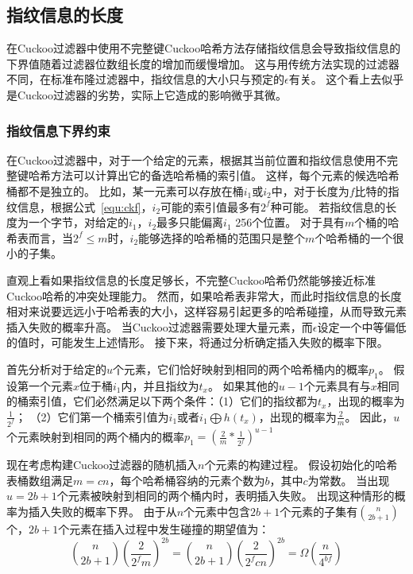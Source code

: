 \subsection{指纹信息的长度}
在Cuckoo过滤器中使用不完整键Cuckoo哈希方法存储指纹信息会导致指纹信息的下界值随着过滤器位数组长度的增加而缓慢增加。
这与用传统方法实现的过滤器不同，在标准布隆过滤器中，指纹信息的大小只与预定的$\epsilon$有关。
这个看上去似乎是Cuckoo过滤器的劣势，实际上它造成的影响微乎其微。

\subsubsection{指纹信息下界约束}
在Cuckoo过滤器中，对于一个给定的元素，根据其当前位置和指纹信息使用不完整键哈希方法可以计算出它的备选哈希桶的索引值。
这样，每个元素的候选哈希桶都不是独立的。
比如，某一元素可以存放在桶$i_1$或$i_2$中，对于长度为$f$比特的指纹信息，根据公式~\ref{equ:ckf}，$i_2$可能的索引值最多有$2^f$种可能。
若指纹信息的长度为一个字节，对给定的$i_1$，$i_2$最多只能偏离$i_1$ 256个位置。
对于具有$m$个桶的哈希表而言，当$2^f \leq m$时，$i_2$能够选择的哈希桶的范围只是整个$m$个哈希桶的一个很小的子集。

直观上看如果指纹信息的长度足够长，不完整Cuckoo哈希仍然能够接近标准Cuckoo哈希的冲突处理能力。
然而，如果哈希表非常大，而此时指纹信息的长度相对来说要远远小于哈希表的大小，这样容易引起更多的哈希碰撞，从而导致元素插入失败的概率升高。
当Cuckoo过滤器需要处理大量元素，而$\epsilon$设定一个中等偏低的值时，可能发生上述情形。
接下来，将通过分析确定插入失败的概率下限。

首先分析对于给定的$u$个元素，它们恰好映射到相同的两个哈希桶内的概率$p_1$。
假设第一个元素$x$位于桶$i_1$内，并且指纹为$t_x$。
如果其他的$u-1$个元素具有与$x$相同的桶索引值，它们必然满足以下两个条件：（1）它们的指纹都为$t_x$，出现的概率为$\frac{1}{2^f}$；
（2）它们第一个桶索引值为$i_1$或者$i_1 \bigoplus h(t_x)$，出现的概率为$\frac{2}{m}$。
因此，$u$个元素映射到相同的两个桶内的概率$p_1 = (\frac{2}{m}\ast \frac{1}{2^f})^{u-1}$

现在考虑构建Cuckoo过滤器的随机插入$n$个元素的构建过程。
假设初始化的哈希表桶数组满足$m = cn$，每个哈希桶容纳的元素个数为$b$，其中$c$为常数。
当出现$u = 2b+1$个元素被映射到相同的两个桶内时，表明插入失败。
出现这种情形的概率为插入失败的概率下界。
由于从$n$个元素中包含$2b+1$个元素的子集有$\binom{n}{2b+1}$个，$2b+1$个元素在插入过程中发生碰撞的期望值为：
\begin{equation}
\binom{n}{2b+1}(\frac{2}{2^fm})^{2b} = \binom{n}{2b+1}(\frac{2}{2^f{cn}})^{2b} = \Omega(\frac{n}{4^{bf}}) 
\label{equ:cbf_f}
\end{equation}

